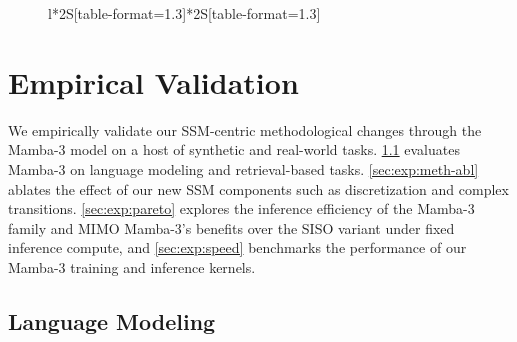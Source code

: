 \documentclass{article}
\theoremstyle{plain}
\theoremstyle{definition}
\theoremstyle{remark}
\begin{document}
{\begin{figure}[!t]
\begin{minipage}[b]{0.48\linewidth}
{\begin{tabular}{l*{2}{S[table-format=1.3]}*{2}{S[table-format=1.3]}}
          \bottomrule
        \end{tabular}
    }
    \label{tab:benchmark}
  \end{minipage}
\end{figure}
}

\section{Empirical Validation}
\label{sec:empirical_validation}
We empirically validate our SSM-centric methodological changes through the Mamba-3 model on a host of synthetic and real-world tasks.
\cref{sec:exp:lm} evaluates Mamba-3 on language modeling and retrieval-based tasks.
\cref{sec:exp:meth-abl} ablates the effect of our new SSM components such as discretization and complex transitions.
\cref{sec:exp:pareto} explores the inference efficiency of the Mamba-3 family and MIMO Mamba-3's benefits over the SISO variant under fixed inference compute, and \cref{sec:exp:speed} benchmarks the performance of our Mamba-3 training and inference kernels.

\subsection{Language Modeling}
\label{sec:exp:lm}
\end{document}
